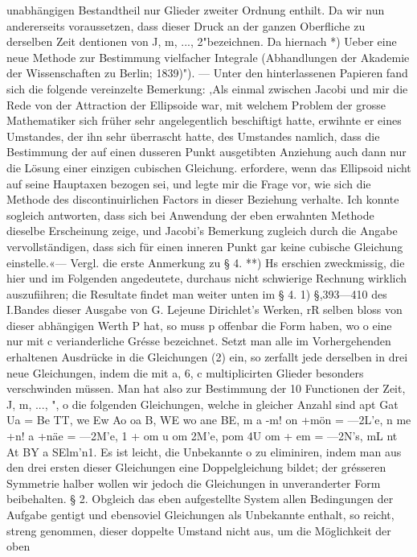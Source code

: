 \documentclass[11pt]{article}
\begin{document}
unabhängigen Bestandtheil nur Glieder zweiter Ordnung enthilt. Da wir nun andererseits
voraussetzen, dass dieser Druck an der ganzen Oberfliche zu derselben Zeit dentionen
von J, m, ..., 2"bezeichnen. Da hiernach *) Ueber eine neue Methode zur Bestimmung
vielfacher Integrale (Abhandlungen der Akademie der Wissenschaften zu Berlin; 1839)").
— Unter den hinterlassenen Papieren fand sich die folgende vereinzelte Bemerkung: ,Als
einmal zwischen Jacobi und mir die Rede von der Attraction der Ellipsoide war, mit welchem Problem der grosse Mathematiker sich früher sehr angelegentlich beschiftigt hatte,
erwihnte er eines Umstandes, der ihn sehr überrascht hatte, des Umstandes namlich,
dass die Bestimmung der auf einen dusseren Punkt ausgetibten Anziehung auch dann
nur die Lösung einer einzigen cubischen Gleichung. erfordere, wenn das Ellipsoid nicht
auf seine Hauptaxen bezogen sei, und legte mir die Frage vor, wie sich die Methode des
discontinuirlichen Factors in dieser Beziehung verhalte. Ich konnte sogleich antworten,
dass sich bei Anwendung der eben erwahnten Methode dieselbe Erscheinung zeige, und
Jacobi’s Bemerkung zugleich durch die Angabe vervollständigen, dass sich für einen inneren Punkt gar keine cubische Gleichung einstelle.«— Vergl. die erste Anmerkung zu
§ 4. **) Hs erschien zweckmissig, die hier und im Folgenden angedeutete, durchaus nicht
schwierige Rechnung wirklich auszufiihren; die Resultate findet man weiter unten im § 4.
1) §,393—410 des I.Bandes dieser Ausgabe von G. Lejeune Dirichlet’s Werken, rR
selben bloss von dieser abhängigen Werth P hat, so muss p offenbar die Form haben,
wo o eine nur mit c verianderliche Grésse bezeichnet. Setzt man alle im Vorhergehenden
erhaltenen Ausdrücke in die Gleichungen (2) ein, so zerfallt jede derselben in drei neue
Gleichungen, indem die mit a, 6, c multiplicirten Glieder besonders verschwinden müssen.
Man hat also zur Bestimmung der 10 Functionen der Zeit, J, m, ..., ", o die folgenden
Gleichungen, welche in gleicher Anzahl sind apt Gat Ua = Be TT, we Ew Ao oa B, WE
wo ane BE, m a -m! on +mön = —2L’e, n me +n! a +näe = —2M’e, 1 + om u om 2M’e,
pom 4U om + em = —2N’s, mL nt At BY a SElm’n1. Es ist leicht, die Unbekannte o zu
eliminiren, indem man aus den drei ersten dieser Gleichungen eine Doppelgleichung bildet;
der grésseren Symmetrie halber wollen wir jedoch die Gleichungen in unveranderter Form
beibehalten. § 2. Obgleich das eben aufgestellte System allen Bedingungen der Aufgabe
gentigt und ebensoviel Gleichungen als Unbekannte enthalt, so reicht, streng genommen,
dieser doppelte Umstand nicht aus, um die Möglichkeit der oben
\end{document}
